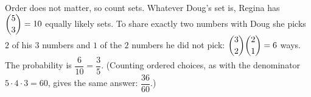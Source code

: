 Order does not matter, so count sets. Whatever Doug's set is, Regina has $\dbinom53=10$ equally likely sets. To share exactly two numbers with Doug she picks $2$ of his $3$ numbers and $1$ of the $2$ numbers he did not pick: $\dbinom32\dbinom21=6$ ways. The probability is $\dfrac{6}{10}=\boxed{\dfrac{3}{5}}$. (Counting ordered choices, as with the denominator $5\cdot4\cdot3=60$, gives the same answer: $\dfrac{36}{60}$.)
